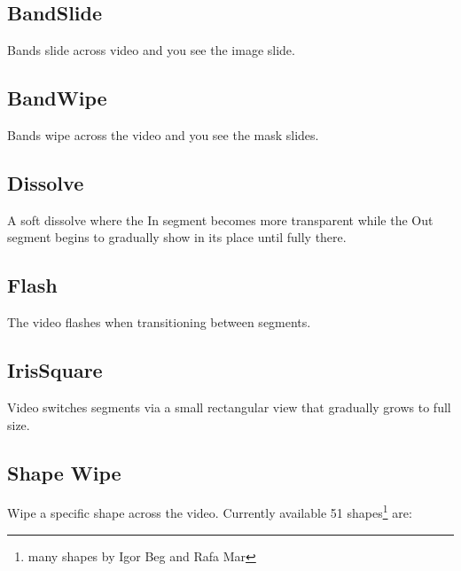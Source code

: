 \subsection*{BandSlide}%
\label{sub:bandslide}

Bands slide across video and you see the image slide.

\subsection*{BandWipe}%
\label{sub:bandwipe}

Bands wipe across the video and you see the mask slides.

\subsection*{Dissolve}%
\label{sub:dissolve}

A soft dissolve where the In segment becomes more transparent while the Out segment begins to gradually show in its place until fully there.

\subsection*{Flash}%
\label{sub:flash}

The video flashes when transitioning between segments.

\subsection*{IrisSquare}%
\label{sub:irissquare}

Video switches segments via a small rectangular view that gradually grows to full size.

\subsection*{Shape Wipe}%
\label{sub:shape_wipe}

Wipe a specific shape across the video. Currently available 51 shapes\protect\footnote{many shapes by Igor Beg and Rafa Mar} are:

